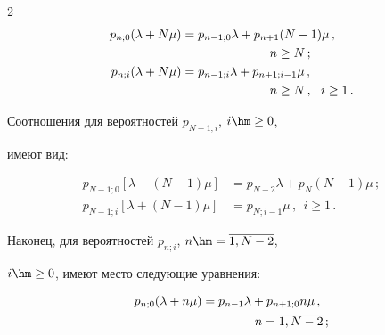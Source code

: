 \begin{multicols}{2}
\begin{align}
\label{eq-1-1}


 p_{n;0} (\lambda+N\mu) &=


p_{n-1;0} \lambda + p_{n+1} (N-1) \mu\,,\notag\\


&\hspace*{25mm}n\ge N\,;


\\


\label{eq-1-2} 


p_{n;i} (\lambda+N\mu) &=


p_{n-1;i} \lambda + p_{n+1;i-1} \mu\,,\ \notag\\ 


&\hspace*{25mm}n\ge N\,,\ \ i \ge 1\,.


\end{align}





Соотношения для вероятностей $p_{N-1;i}$, $i \hm\ge 0$,


имеют вид:


\begin{align}


\label{eq-1-3}


p_{N-1;0} [\lambda+(N-1)\mu]


&= p_{N-2} \lambda + p_{N} (N-1)\mu \,;


\\


\label{eq-1-4}


p_{N-1;i} [\lambda+(N-1)\mu] &= p_{N;i-1} \mu \,,\ \ i \ge 1\,.


\end{align}





Наконец, для вероятностей $p_{n;i}$, $n\hm=\overline{1,N-2}$,


$i \hm\ge 0$, имеют место следующие уравнения:


\begin{align}


\label{eq-1-5}


p_{n;0} (\lambda+n\mu) &= p_{n-1} \lambda +


p_{n+1;0} n\mu \,,\notag\\


& \hspace*{15mm}n=\overline{1,N-2}\,;


\\



\end{align}
\end{multicols}
